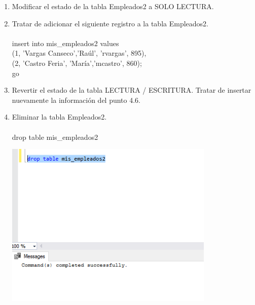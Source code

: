 \begin{enumerate}[1.]
\begin{center}
	\end{center}
	\item Modificar el estado de la tabla Empleados2 a SOLO LECTURA.
	\item Tratar de adicionar el siguiente registro a la tabla Empleados2.
	\\
	\\insert into mis\_empleados2 values
	\\(1, 'Vargas Canseco','Ra\'ul', 'rvargas', 895),
	\\(2, 'Castro Feria',  'Mar\'ia','mcastro', 860);
	\\go
	\item Revertir el estado de la tabla LECTURA / ESCRITURA. Tratar de insertar nuevamente la información del punto 4.6.
	\item Eliminar la tabla Empleados2.
	\\
	\\drop table mis\_empleados2
	\begin{center}
	\includegraphics[width=10cm]{./Imagenes/prac2eje8} 
	\end{center}
	
\end{enumerate}